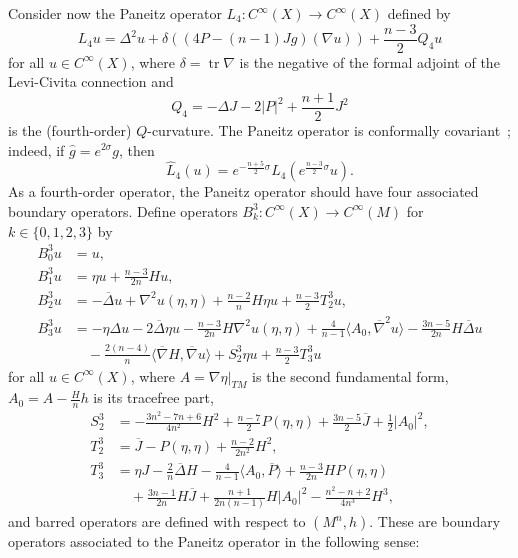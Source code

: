 \documentclass{amsart}
\theoremstyle{definition}
\theoremstyle{remark}
\numberwithin{equation}{section}
\begin{document}
Consider now the Paneitz operator $L_4\colon C^\infty(X)\to C^\infty(X)$ defined by
\[ L_4u = \Delta^2u + \delta\left((4P-(n-1)Jg)(\nabla u)\right) + \frac{n-3}{2}Q_4u \]
for all $u\in C^\infty(X)$, where $\delta=\operatorname{tr}\nabla$ is the negative of the formal adjoint of the Levi-Civita connection and
\[ Q_4 = -\Delta J - 2{\lvert} P{\rvert}^2 + \frac{n+1}{2}J^2 \]
is the (fourth-order) $Q$-curvature.  The Paneitz operator is conformally covariant~\cite{Paneitz1983}; indeed, if ${\widehat{g}}=e^{2\sigma}g$, then
\begin{equation}
 \label{eqn:l4_conf}
 {\widehat{L}}_4(u) = e^{-\frac{n+5}{2}\sigma}L_4\left(e^{\frac{n-3}{2}\sigma}u\right) .
\end{equation}
As a fourth-order operator, the Paneitz operator should have four associated boundary operators.  Define operators $B_k^3\colon C^\infty(X)\to C^\infty(M)$ for $k\in\{0,1,2,3\}$ by
\begin{align*}
 B_0^3u & = u , \\
 B_1^3u & = \eta u + \frac{n-3}{2n}Hu, \\
 B_2^3u & = -{\overline{\Delta}} u + \nabla^2u(\eta,\eta) + \frac{n-2}{n}H\eta u + \frac{n-3}{2}T_2^3u, \\
 B_3^3u & = -\eta\Delta u - 2{\overline{\Delta}}\eta u - \frac{n-3}{2n}H\nabla^2u(\eta,\eta) + \frac{4}{n-1}{\langle} A_0,{\overline{\nabla}}^2u{\rangle} - \frac{3n-5}{2n}H{\overline{\Delta}} u \\
  & \quad - \frac{2(n-4)}{n}{\langle}{\overline{\nabla}} H,{\overline{\nabla}} u{\rangle} + S_2^3\eta u + \frac{n-3}{2}T_3^3u
\end{align*}
for all $u\in C^\infty(X)$, where $A=\nabla\eta{\rvert}_{TM}$ is the second fundamental form, $A_0=A-\frac{H}{n}h$ is its tracefree part,
\begin{align*}
 S_2^3 & = -\frac{3n^2-7n+6}{4n^2}H^2 + \frac{n-7}{2}P(\eta,\eta) + \frac{3n-5}{2}{\overline{J}} + \frac{1}{2}{\lvert} A_0{\rvert}^2 , \\
 T_2^3 & = {\overline{J}} - P(\eta,\eta) + \frac{n-2}{2n^2}H^2, \\
 T_3^3 & = \eta J - \frac{2}{n}{\overline{\Delta}} H - \frac{4}{n-1}{\langle} A_0,{\overline{P}}{\rangle} + \frac{n-3}{2n}HP(\eta,\eta) \\
  & \quad + \frac{3n-1}{2n}H{\overline{J}} + \frac{n+1}{2n(n-1)}H{\lvert} A_0{\rvert}^2 - \frac{n^2-n+2}{4n^3}H^3 ,
\end{align*}
and barred operators are defined with respect to $(M^n,h)$.  These are boundary operators associated to the Paneitz operator in the following sense:
\end{document}
